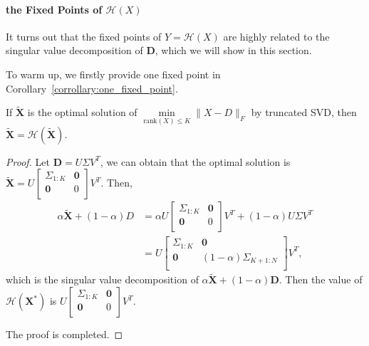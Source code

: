 \paragraph{the Fixed Points of $\mathcal{H}(X)$}

It turns out that the fixed points of $Y = \mathcal{H}(X)$ are highly related to the singular value decomposition of $\mathbf{D}$, which we will show in this section.

To warm up, we firstly provide one fixed point in Corollary~\ref{corrollary:one_fixed_point}.
\begin{corollary}\label{corrollary:one_fixed_point}
If $\tilde{\mathbf{X}}$ is the optimal solution of $\underset{\text{rank}(X)\leq K}{\min}\|X-D\|_F$ by truncated SVD, then $\tilde{\mathbf{X}}=\mathcal{H}(\tilde{\mathbf{X}})$.
\end{corollary}

\begin{proof}
Let $\mathbf{D} = U\Sigma V^T$, we can obtain that the optimal solution is $\tilde{\mathbf{X}} = U\left[
       \begin{array}{cc}
         \Sigma_{1:K} & \mathbf{0} \\
         \mathbf{0} & 0 \\
       \end{array}
     \right] V^T$. Then,
\begin{align*}
\alpha \tilde{\mathbf{X}}+(1-\alpha)D &= \alpha U\left[
       \begin{array}{cc}
         \Sigma_{1:K} & \mathbf{0} \\
         \mathbf{0} & 0 \\
       \end{array}
     \right] V^T + (1-\alpha)U\Sigma V^T\\
& = U\left[
       \begin{array}{cc}
         \Sigma_{1:K} & \mathbf{0} \\
         \mathbf{0} & (1-\alpha)\Sigma_{K+1:N} \\
       \end{array}
     \right] V^T,
\end{align*}
which is the singular value decomposition of $\alpha \tilde{\mathbf{X}}+(1-\alpha)\mathbf{D}$. Then the value of $\mathcal{H}(\mathbf{X}^*)$ is $ U\left[
       \begin{array}{cc}
         \Sigma_{1:K} & \mathbf{0} \\
         \mathbf{0} & 0 \\
       \end{array}
     \right] V^T$.

The proof is completed.
\end{proof}

